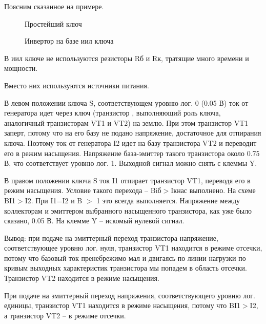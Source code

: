 Поясним сказанное на примере.

\begin{center}
	\begin{figure}[h!]
		\caption{Простейший ключ}	
		\label{iil1}
	\end{figure}
\end{center}

 

\begin{center}
	\begin{figure}[h!]
		\caption{Инвертор на базе иил ключа}	
		\label{iil3}
	\end{figure}
\end{center}



В иил ключе не используются резисторы Rб и Rк, тратящие много времени и мощности. 

Вместо них используются источники питания. 

В левом положении ключа S, соответствующем уровню  лог. 0 (0.05 В) ток от генератора идет через ключ (транзистор , выполняющий роль ключа, аналогичный транзисторам VT1 и VT2) на землю. При этом транзистор VT1 заперт, потому что на его базу не подано напряжение, достаточное для отпирания ключа. Поэтому ток от генератора I2 идет на базу транзистора VT2 и переводит его в режим насыщения. Напряжение база-эмиттер такого транзистора около 0.75 В, что соответствует уровню лог. 1. Выходной сигнал можно снять с клеммы Y.

В правом положении ключа S ток I1 отпирает транзистор VT1, переводя его в режим насыщения. Условие такого перехода -- Biб$>$Iкнас выполнено. На схеме BI1$>$I2. При I1=I2 и B $>$ 1 это всегда выполняется. Напряжение между коллекторам и эмиттером выбранного насыщенного транзистора, как уже было сказано, 0.05 В. На клемме Y -- искомый нулевой сигнал.

Вывод: при подаче на эмиттерный переход транзистора напряжение, соответствующее уровню лог. нуля, транзистор VT1 находится в режиме отсечки, потому что базовый ток пренебрежимо мал и двигаясь по линии нагрузки по кривым выходных характеристик транзистора мы попадем в область отсечки. Транзистор VT2 находится в режиме насыщения.

При подаче на эмиттерный переход напряжения, соответствующего уровню лог. единицы, транзистор VT1 находится в режиме насыщения, потому что BI1$>$I2, а транзистор VT2 -- в режиме отсечки.

